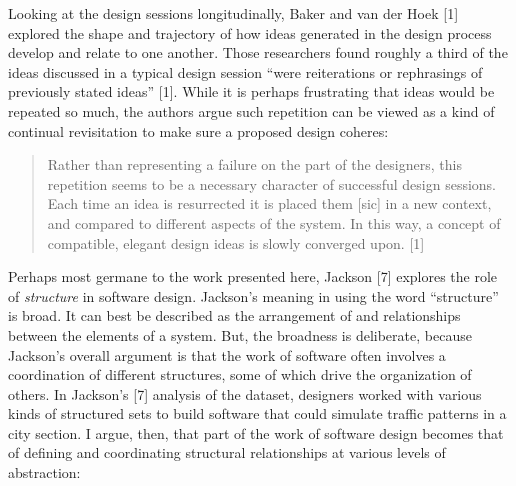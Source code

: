 Looking at the design sessions longitudinally, Baker and van der Hoek {[}1{]} explored the shape and trajectory of how ideas generated in the design process develop and relate to one another. Those researchers found roughly a third of the ideas discussed in a typical design session ``were reiterations or rephrasings of previously stated ideas'' {[}1{]}. While it is perhaps frustrating that ideas would be repeated so much, the authors argue such repetition can be viewed as a kind of continual revisitation to make sure a proposed design coheres:

\begin{quote}
Rather than representing a failure on the part of the designers, this repetition seems to be a necessary character of successful design sessions. Each time an idea is resurrected it is placed them {[}sic{]} in a new context, and compared to different aspects of the system. In this way, a concept of compatible, elegant design ideas is slowly converged upon. {[}1{]}
\end{quote}

Perhaps most germane to the work presented here, Jackson {[}7{]} explores the role of \emph{structure} in software design. Jackson's meaning in using the word ``structure'' is broad. It can best be described as the arrangement of and relationships between the elements of a system. But, the broadness is deliberate, because Jackson's overall argument is that the work of software often involves a coordination of different structures, some of which drive the organization of others. In Jackson's {[}7{]} analysis of the dataset, designers worked with various kinds of structured sets to build software that could simulate traffic patterns in a city section. I argue, then, that part of the work of software design becomes that of defining and coordinating structural relationships at various levels of abstraction:

